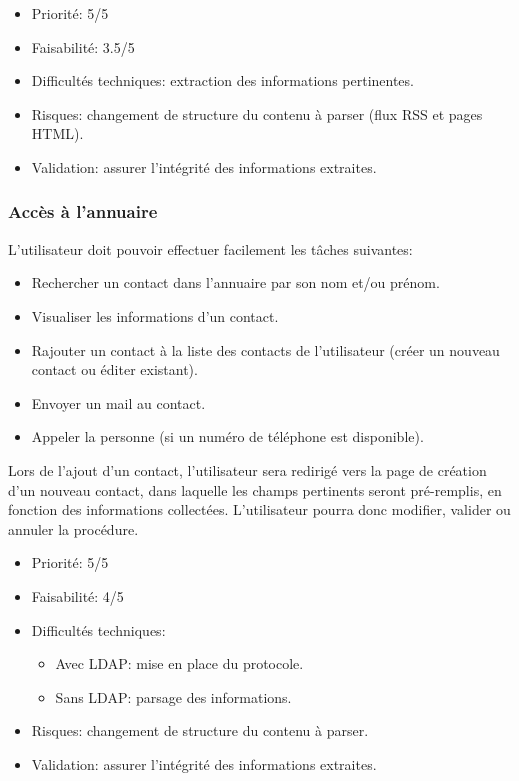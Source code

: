 \documentclass [pdftex,12pt] {report}
\begin{document}
\begin{itemize}
\renewcommand{\labelitemi}{$\bullet$}
\item Priorité: 5/5
\item Faisabilité: 3.5/5
\item Difficultés techniques: extraction des informations pertinentes.
\item Risques: changement de structure du contenu à parser (flux RSS et pages HTML).
\item Validation: assurer l'intégrité des informations extraites.
\end{itemize}

\subsubsection{Accès à l'annuaire}
L'utilisateur doit pouvoir effectuer facilement les tâches suivantes:
\begin{itemize}
\renewcommand{\labelitemi}{$\bullet$}
\item Rechercher un contact dans l'annuaire par son nom et/ou prénom.
\item Visualiser les informations d'un contact.
\item Rajouter un contact à la liste des contacts de l'utilisateur (créer un nouveau contact ou éditer existant).
\item Envoyer un mail au contact.
\item Appeler la personne (si un numéro de téléphone est disponible).
\end{itemize}
Lors de l'ajout d'un contact, l'utilisateur sera redirigé vers la page de création d'un nouveau contact, dans laquelle les champs pertinents seront pré-remplis, en fonction des informations collectées. L'utilisateur pourra donc modifier, valider ou annuler la procédure. \\

\begin{itemize}
\renewcommand{\labelitemi}{$\bullet$}
\item Priorité: 5/5
\item Faisabilité: 4/5
\item Difficultés techniques:
\begin{itemize}
\item Avec LDAP: mise en place du protocole.
\item Sans LDAP: parsage des informations.
\end{itemize} 
\item Risques: changement de structure du contenu à parser.
\item Validation: assurer l'intégrité des informations extraites.
\end{itemize}
\end{document}
